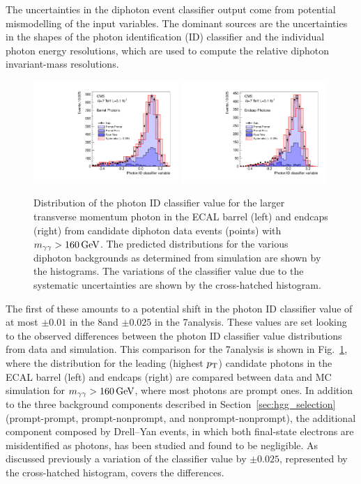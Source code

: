 \documentclass[11pt,twoside,a4paper,cmspaper,final,collab]{cms-tdr}
\begin{document}
The uncertainties in the diphoton event classifier output come from potential mismodelling of the input
variables. The dominant sources are the uncertainties in the shapes of the photon identification (ID) classifier and
the individual photon energy resolutions, which are used to compute the relative diphoton invariant-mass resolutions.

\begin{figure}
  \begin{center}
    \includegraphics[width=0.49\textwidth]{figures/hgg_phidmva1eb}
    \includegraphics[width=0.49\textwidth]{figures/hgg_phidmva1ee}
    \caption{
Distribution of the photon ID classifier value for the larger transverse momentum photon in the
ECAL barrel (left) and endcaps (right) from candidate diphoton data
events (points) with $m_{\gamma\gamma}>160\,\text{Ge\hspace{-.08em}V}$.
The predicted distributions for the various diphoton backgrounds as determined from simulation are shown by the histograms.
The variations of the classifier value due to the systematic uncertainties are shown by the cross-hatched histogram.}
    \label{fig:hgg_phoidshift}
  \end{center}
\end{figure}

The first of these
amounts to a potential shift in the photon ID classifier value of at
most ${\pm}0.01$ in the 8\TeV and ${\pm}0.025$ in the 7\TeV analysis.
These values are
set looking to
the observed differences between the  photon ID classifier value distributions from data and simulation.
This comparison for the 7\TeV analysis
is shown in Fig.~\ref{fig:hgg_phoidshift}, where the distribution for the leading (highest $p_{\mathrm{T}}$)
candidate photons in the ECAL barrel (left) and endcaps (right) are compared between data and MC simulation for
$m_{\gamma\gamma}>160\,\text{Ge\hspace{-.08em}V}$, where most photons are prompt ones.
In addition to the three background components described in Section~\ref{sec:hgg_selection} (prompt-prompt, prompt-nonprompt, and
nonprompt-nonprompt),
the additional component composed by Drell--Yan events, in which both final-state electrons are misidentified as photons, has been studied
and found to be negligible.
As discussed previously
a variation of the classifier value by ${\pm}0.025$, represented by the cross-hatched histogram, covers the
differences.
\end{document}
